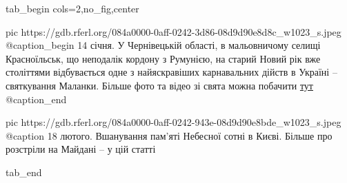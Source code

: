  
 
 
 
 


\ifcmt
  tab_begin cols=2,no_fig,center

     pic https://gdb.rferl.org/084a0000-0aff-0242-3d86-08d9d90e8d8c_w1023_s.jpeg
		 @caption_begin
14 січня. У Чернівецькій області, в мальовничому селищі Красноїльськ, що
неподалік кордону з Румунією, на старий Новий рік вже століттями
відбувається одне з найяскравіших карнавальних дійств в Україні –
святкування Маланки. Більше фото та відео зі свята можна побачити 
\href{https://www.radiosvoboda.org/a/31048285.html}{тут} 
		 @caption_end

		 pic https://gdb.rferl.org/084a0000-0aff-0242-943e-08d9d90e8bde_w1023_s.jpeg
		 @caption 18 лютого. Вшанування пам'яті Небесної сотні в Києві. Більше про розстріли на Майдані – у цій статті

  tab_end
\fi
